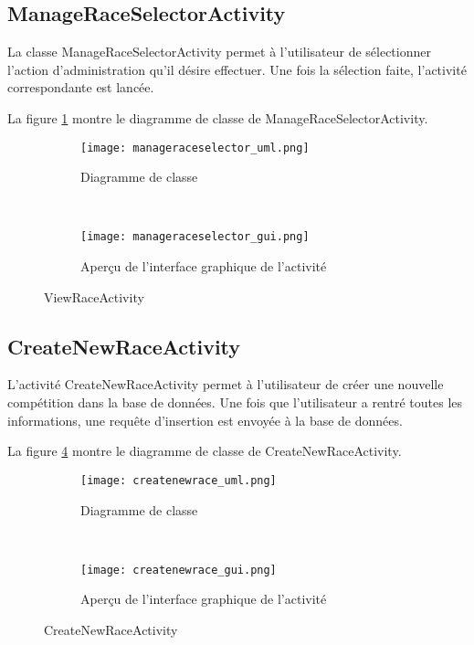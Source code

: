 
\subsection{ManageRaceSelectorActivity}

La classe ManageRaceSelectorActivity permet à l'utilisateur de sélectionner l'action d'administration qu'il désire effectuer. Une fois la sélection  faite, l'activité correspondante est lancée.

La figure \ref{fig:manageraceselector_uml} montre le diagramme de classe de ManageRaceSelectorActivity.

\begin{figure}[htb!]
    \centering
    \begin{subfigure}[htb]{0.49\textwidth}
		\texttt{[image: manageraceselector\_uml.png]} 
		\caption{Diagramme de classe}
		\label{fig:manageraceselector_uml}
    \end{subfigure}
    ~ %
    \begin{subfigure}[htb]{0.49\textwidth}
		\texttt{[image: manageraceselector\_gui.png]} 
		\caption{Aperçu de l'interface graphique de l'activité}
		\label{fig:manageraceselector_gui}
    \end{subfigure}
    \caption{ViewRaceActivity}\label{fig:manageraceselector_fig}
\end{figure}

\subsection{CreateNewRaceActivity}

L'activité CreateNewRaceActivity permet à l'utilisateur de créer une nouvelle compétition dans la base de données. Une fois que l'utilisateur a rentré toutes les informations, une requête d'insertion est envoyée à la base de données.

La figure \ref{fig:createnewrace_uml} montre le diagramme de classe de CreateNewRaceActivity.

\begin{figure}[htb!]
    \centering
    \begin{subfigure}[htb]{0.49\textwidth}
		\texttt{[image: createnewrace\_uml.png]} 
		\caption{Diagramme de classe}
		\label{fig:createnewrace_uml}
    \end{subfigure}
    ~ %
    \begin{subfigure}[htb]{0.49\textwidth}
		\texttt{[image: createnewrace\_gui.png]} 
		\caption{Aperçu de l'interface graphique de l'activité}
		\label{fig:createnewrace_gui}
    \end{subfigure}
    \caption{CreateNewRaceActivity}\label{fig:createnewrace_fig}
\end{figure}

